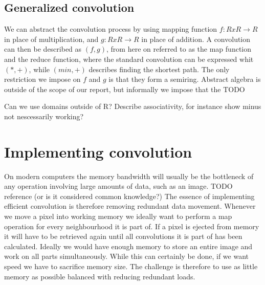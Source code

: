 \subsection{Generalized convolution}
We can abstract the convolution process by using mapping function $f: R x R \rightarrow R$ in place of multiplication, and $g: R x R \rightarrow R$ in place of addition.
A convolution can then be described as $(f, g)$, from here on referred to as the map function and the reduce function, where the standard convolution can be expressed whit $(*, +)$, while $(min, +)$ describes finding the shortest path.
The only restriction we impose on $f$ and $g$ is that they form a semiring.
Abstract algebra is outside of the scope of our report, but informally we impose that the TODO 

Can we use domains outside of R? 
Describe associativity, for instance show minus not nescessarily working?

\section{Implementing convolution}
On modern computers the memory bandwidth will usually be the bottleneck of any operation involving large amounts of data, such as an image. TODO reference (or is it considered common knowledge?)
The essence of implementing efficient convolution is therefore removing redundant data movement.
Whenever we move a pixel into working memory we ideally want to perform a map operation for every neighbourhood it is part of.
If a pixel is ejected from memory it will have to be retrieved again until all convolutions it is part of has been calculated.
Ideally we would have enough memory to store an entire image and work on all parts simultaneously. While this can certainly be done, if we want speed we have to sacrifice memory size.
The challenge is therefore to use as little memory as possible balanced with reducing redundant loads.\\

